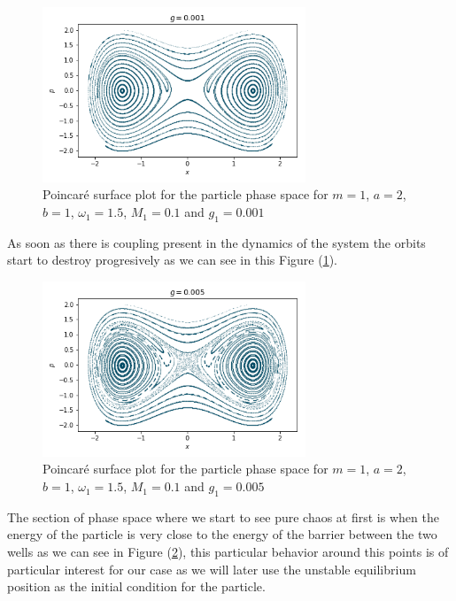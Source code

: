 \begin{figure}[H]
\centering
\includegraphics[width=0.7\textwidth]{Figures/poincare_g0001.png}
\caption{Poincaré surface plot for the particle phase space for $m=1$, $a=2$, $b=1$, $\omega_1=1.5$, $M_1=0.1$ and $g_1=0.001$
}
\label{fig:poinc_g0001}
\end{figure}

As soon as there is coupling present in the dynamics of the system the orbits start to destroy progresively as we can see in this Figure (\ref{fig:poinc_g0001}). 

\begin{figure}[H]
\centering
\includegraphics[width=0.7\textwidth]{Figures/poincare_g0005.png}
\caption{Poincaré surface plot for the particle phase space for $m=1$, $a=2$, $b=1$, $\omega_1=1.5$, $M_1=0.1$ and $g_1=0.005$
}
\label{fig:poinc_g0005}
\end{figure}

The section of phase space where we start to see pure chaos at first is when the energy of the particle is very close to the energy of the barrier between the two wells as we can see in Figure (\ref{fig:poinc_g0005}), this particular behavior around this points is of particular interest for our case as we will later use the unstable equilibrium position as the initial condition for the particle.

